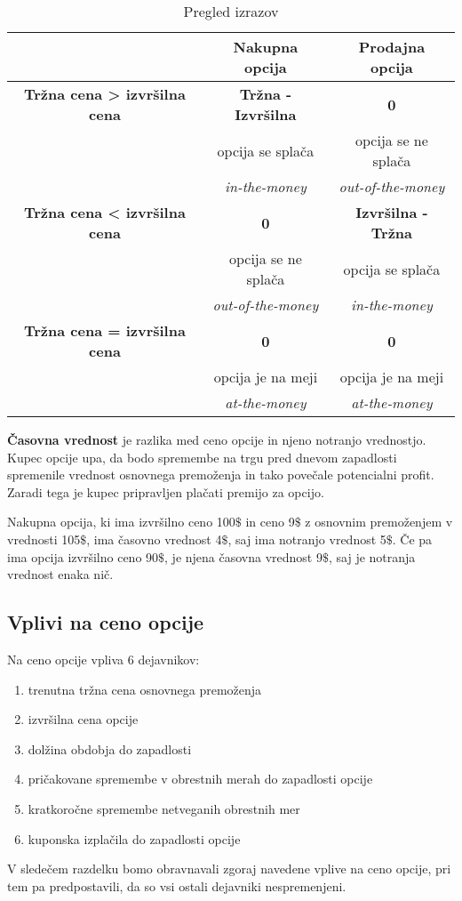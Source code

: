 \documentclass[a4paper]{article}
\begin{document}
\begin{table}[h]
    \centering
    \begin{tabular} { c | c | c }
        \toprule
        & Nakupna opcija & Prodajna opcija \\
        \hline
        \textbf{Tržna cena > izvršilna cena} & \textbf{Tržna - Izvršilna} & \textbf{0}  \\
        \hline
        & opcija se splača & opcija se ne splača \\ 
        & \textit{in-the-money} & \textit{out-of-the-money} \\
        \hline
        \textbf{Tržna cena < izvršilna cena} &\textbf{0} & \textbf{Izvršilna - Tržna} \\
        \hline
        & opcija se ne splača & opcija se splača \\
        & \textit{out-of-the-money} &\textit{in-the-money}\\ 
        \hline
        \textbf{Tržna cena = izvršilna cena} & \textbf{0} & \textbf{0} \\
        \hline
        & opcija je na meji & opcija je na meji \\
        & \textit{at-the-money} &  \textit{at-the-money} \\  
        \bottomrule
    \end{tabular}
    \caption{Pregled izrazov}
\end{table}

\textbf{Časovna vrednost} je razlika med ceno opcije in njeno notranjo vrednostjo. Kupec opcije upa, da bodo spremembe na trgu pred
dnevom zapadlosti spremenile vrednost osnovnega premoženja in tako povečale potencialni profit. Zaradi tega je kupec pripravljen plačati
premijo za opcijo. 

Nakupna opcija, ki ima izvršilno ceno 100$\$$ in ceno 9$\$$ z osnovnim premoženjem v vrednosti 105$\$$, ima časovno vrednost 4$\$$,
saj ima notranjo vrednost 5$\$$. Če pa ima opcija izvršilno ceno 90$\$$, je njena časovna vrednost 9$\$$, saj je notranja vrednost enaka nič.

\subsection{Vplivi na ceno opcije}
Na ceno opcije vpliva 6 dejavnikov:
\begin{enumerate}
    \item trenutna tržna cena osnovnega premoženja
    \item izvršilna cena opcije
    \item dolžina obdobja do zapadlosti
    \item pričakovane spremembe v obrestnih merah do zapadlosti opcije
    \item kratkoročne spremembe netveganih obrestnih mer
    \item kuponska izplačila do zapadlosti opcije
\end{enumerate}
V sledečem razdelku bomo obravnavali zgoraj navedene vplive na ceno opcije, pri tem pa predpostavili, da so vsi ostali
dejavniki nespremenjeni.
\end{document}
